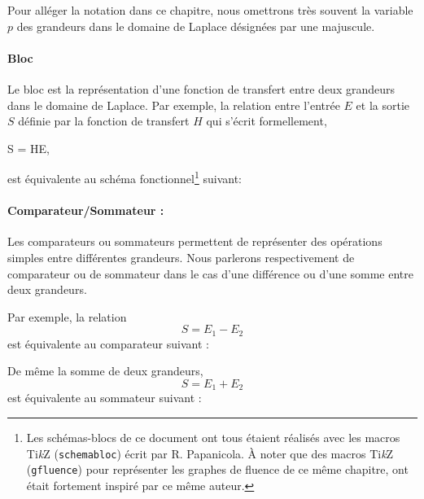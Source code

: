 Pour alléger la notation dans ce chapitre, nous omettrons 
très souvent la variable $p$ des grandeurs dans le domaine de Laplace désignées 
par une majuscule.
\paragraph{Bloc}
Le bloc est la représentation d'une fonction de transfert entre deux 
grandeurs dans le domaine de Laplace. Par exemple, la relation entre l'entrée 
$E$ et la sortie $S$ définie par la fonction de transfert $H$ qui s'écrit 
formellement, 
\begin{bequation}
S = HE,\label{eq-ES}
\end{bequation}
est équivalente au schéma fonctionnel\footnote{Les schémas-blocs de ce document
ont tous étaient réalisés avec les macros Ti\emph{k}Z (\verb?schemabloc?) 
écrit par R. Papanicola\cite{schemabloc}. \`A noter que des macros 
Ti\emph{k}Z (\verb?gfluence?) pour représenter les graphes de fluence 
de ce même chapitre, ont était fortement inspiré par ce même auteur.} 
suivant:
\begin{center}

\end{center}
\paragraph{Comparateur/Sommateur :}
Les comparateurs ou sommateurs permettent de représenter des opérations 
simples entre différentes grandeurs.
Nous parlerons respectivement de comparateur ou de sommateur dans le cas 
d'une différence ou d'une somme entre deux grandeurs. 

Par exemple, la relation 
\[
S = E_1-E_2 
\]
est équivalente au comparateur suivant :
\begin{center}

\end{center}
De même la somme de deux grandeurs,
\[
S = E_1+E_2
\]
est équivalente au sommateur suivant :
\begin{center}

\end{center}
